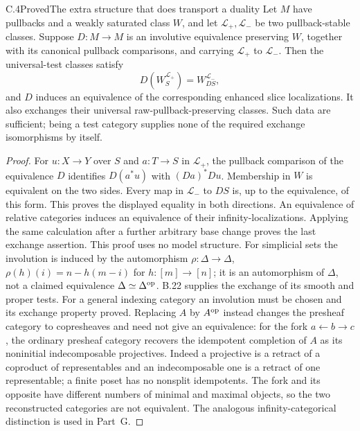 \begin{claim}{C.4}{Proved}{The extra structure that does transport a duality}
Let $M$ have pullbacks and a weakly saturated class $W$, and let
$\mathcal L_+,\mathcal L_-$ be two pullback-stable classes.
Suppose $D:M\to M$ is an involutive equivalence preserving $W$, together
with its canonical pullback comparisons, and carrying $\mathcal L_+$
to $\mathcal L_-$. Then the universal-test classes satisfy
\[
 D(W_S^{\mathcal L_+})=W_{DS}^{\mathcal L_-},
\]
and $D$ induces an equivalence of the corresponding enhanced slice
localizations. It also exchanges their universal raw-pullback-preserving
classes. Such data are sufficient; being a test category supplies none
of the required exchange isomorphisms by itself.
\end{claim}
\begin{proof}
For $u:X\to Y$ over $S$ and $a:T\to S$ in $\mathcal L_+$, the
pullback comparison of the equivalence $D$ identifies
$D(a^*u)$ with $(Da)^*Du$. Membership in $W$ is equivalent on the two
sides. Every map in $\mathcal L_-$ to $DS$ is, up to the equivalence,
of this form. This proves the displayed equality in both directions.
An equivalence of relative categories induces an equivalence of their
infinity-localizations. Applying the same calculation after a further
arbitrary base change proves the last exchange assertion. This proof
uses no model structure.
For simplicial sets the involution is induced by the automorphism
$\rho:\Delta\to\Delta$,
$\rho(h)(i)=n-h(m-i)$ for $h:[m]\to[n]$; it is an automorphism of
$\Delta$, not a claimed equivalence $\Delta\simeq\Delta^{\mathrm{op}}$.
B.22 supplies the exchange of its smooth and proper tests.
For a general indexing category an involution must be chosen and its
exchange property proved. Replacing $A$ by $A^{\mathrm{op}}$ instead changes
the presheaf category to copresheaves and need not give an equivalence:
for the fork $a\leftarrow b\to c$, the ordinary presheaf category
recovers the idempotent completion of $A$ as its noninitial indecomposable projectives.
Indeed a projective is a retract of a coproduct of representables and an
indecomposable one is a retract of one representable; a finite poset has
no nonsplit idempotents. The fork and its opposite have different numbers
of minimal and maximal objects, so the two reconstructed categories are
not equivalent. The analogous infinity-categorical distinction is used
in Part~G.
\end{proof}

